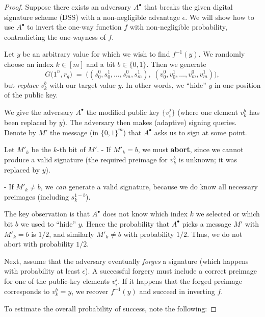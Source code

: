 \begin{proof}
  Suppose there exists an adversary \(A^\bullet\) that breaks the given digital signature scheme (DSS) with a non-negligible advantage \(\epsilon\). We will show how to use \(A^\bullet\) to invert the one-way function \(f\) with non-negligible probability, contradicting the one-wayness of \(f\).

  Let \(y\) be an arbitrary value for which we wish to find \(f^{-1}(y)\). We randomly choose an index \(k \in [m]\) and a bit \(b \in \{0,1\}\). Then we generate 
  \[
    G\bigl(1^{n}, r_g\bigr) 
    \;=\; 
    \bigl( (s^{0}_{0}, s^{1}_{0}, \dots, s^{0}_{m}, s^{1}_{m}),\;
           (v^{0}_{0}, v^{1}_{0}, \dots, v^{0}_{m}, v^{1}_{m}) \bigr),
  \]
  but \emph{replace} \(v_{k}^{b}\) with our target value \(y\). In other words, we “hide” \(y\) in one position of the public key.

  We give the adversary \(A^\bullet\) the modified public key \(\{v_{i}^{j}\}\) (where one element \(v_{k}^{b}\) has been replaced by \(y\)). %
The adversary then makes (adaptive) signing queries. Denote by \(M'\) the message (in \(\{0,1\}^m\)) that \(A^\bullet\) asks us to sign at some point.

  Let \(M'_k\) be the \(k\)-th bit of \(M'\).
  - If \(M'_k = b\), we must \textbf{abort}, since we cannot produce a valid signature (the required preimage for \(v_{k}^{b}\) is unknown; it was replaced by \(y\)).
  
  - If \(M'_k \neq b\), we \emph{can} generate a valid signature, because we do know all necessary preimages (including \(s_{k}^{1-b}\)).

  The key observation is that \(A^\bullet\) does not know which index \(k\) we selected or which bit \(b\) we used to “hide” \(y\). Hence the probability that \(A^\bullet\) picks a message \(M'\) with \(M'_k = b\) is \(1/2\), and similarly \(M'_k \neq b\) with probability \(1/2\). Thus, we do not abort with probability \(1/2\).

  Next, assume that the adversary eventually \emph{forges} a signature (which happens with probability at least \(\epsilon\)). A successful forgery must include a correct preimage for one of the public-key elements \(v_{i}^{j}\). If it happens that the forged preimage corresponds to \(v_{k}^{b} = y\), we recover \(f^{-1}(y)\) and succeed in inverting \(f\).

  To estimate the overall probability of success, note the following:


\end{proof}
